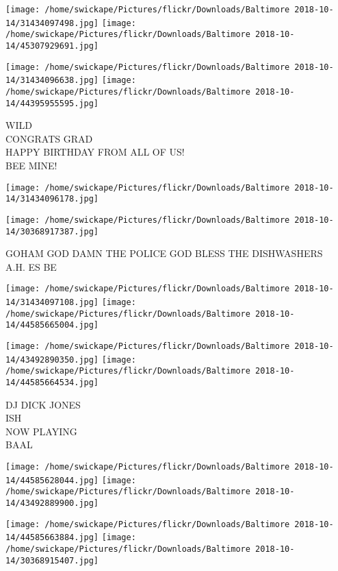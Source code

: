 \documentclass[10pt,letterpaper]{article}
\begin{document}
\texttt{[image: /home/swickape/Pictures/flickr/Downloads/Baltimore 2018-10-14/31434097498.jpg]}
\texttt{[image: /home/swickape/Pictures/flickr/Downloads/Baltimore 2018-10-14/45307929691.jpg]}

\texttt{[image: /home/swickape/Pictures/flickr/Downloads/Baltimore 2018-10-14/31434096638.jpg]}
\texttt{[image: /home/swickape/Pictures/flickr/Downloads/Baltimore 2018-10-14/44395955595.jpg]}

WILD\\
CONGRATS GRAD\\
HAPPY BIRTHDAY FROM ALL OF US!\\
BEE MINE!\\
\pagebreak

\texttt{[image: /home/swickape/Pictures/flickr/Downloads/Baltimore 2018-10-14/31434096178.jpg]}

\vspace{0.25in}
\texttt{[image: /home/swickape/Pictures/flickr/Downloads/Baltimore 2018-10-14/30368917387.jpg]}

GOHAM GOD DAMN THE POLICE GOD BLESS THE DISHWASHERS\\
A.H. ES BE\\
\pagebreak

\texttt{[image: /home/swickape/Pictures/flickr/Downloads/Baltimore 2018-10-14/31434097108.jpg]}
\texttt{[image: /home/swickape/Pictures/flickr/Downloads/Baltimore 2018-10-14/44585665004.jpg]}

\texttt{[image: /home/swickape/Pictures/flickr/Downloads/Baltimore 2018-10-14/43492890350.jpg]}
\texttt{[image: /home/swickape/Pictures/flickr/Downloads/Baltimore 2018-10-14/44585664534.jpg]}

DJ DICK JONES\\
ISH\\
NOW PLAYING\\
BAAL\\
\pagebreak

\texttt{[image: /home/swickape/Pictures/flickr/Downloads/Baltimore 2018-10-14/44585628044.jpg]}
\texttt{[image: /home/swickape/Pictures/flickr/Downloads/Baltimore 2018-10-14/43492889900.jpg]}

\texttt{[image: /home/swickape/Pictures/flickr/Downloads/Baltimore 2018-10-14/44585663884.jpg]}
\texttt{[image: /home/swickape/Pictures/flickr/Downloads/Baltimore 2018-10-14/30368915407.jpg]}
\end{document}
